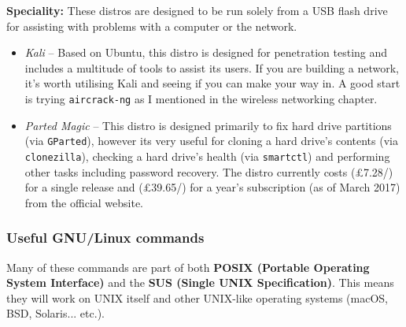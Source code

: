 \documentclass{article}
\begin{document}
\textbf{Speciality:} These distros are designed to be run solely from a USB flash drive for assisting with problems with a computer or the network.

\begin{itemize}
    \item \textit{Kali} -- Based on Ubuntu, this distro is designed for penetration testing and includes a multitude of tools to assist its users. If you are building a network, it's worth utilising Kali and seeing if you can make your way in. A good start is trying \texttt{aircrack-ng} as I mentioned in the wireless networking chapter.

    \item \textit{Parted Magic} -- This distro is designed primarily to fix hard drive partitions (via \texttt{GParted}), however its very useful for cloning a hard drive's contents (via \texttt{clonezilla}), checking a hard drive's health (via \texttt{smartctl}) and performing other tasks including password recovery. The distro currently costs  (\pounds7.28/) for a single release and  (\pounds39.65/) for a year's subscription (as of March 2017) from the official website.
\end{itemize}

\subsubsection{Useful GNU/Linux commands}

Many of these commands are part of both \textbf{POSIX (Portable Operating System Interface)} and the \textbf{SUS (Single UNIX Specification)}. This means they will work on UNIX itself and other UNIX-like operating systems (macOS, BSD, Solaris... etc.).
\end{document}
